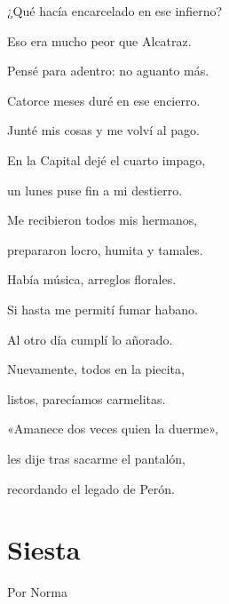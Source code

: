 \documentclass[11pt,twoside,openright,a5paper]{book}
\begin{document}
\begin{center}
¿Qué hacía encarcelado en ese infierno?

Eso era mucho peor que Alcatraz.

Pensé para adentro: no aguanto más.

\vspace{0.5cm}

Catorce meses duré en ese encierro.

Junté mis cosas y me volví al pago.

En la Capital dejé el cuarto impago,

un lunes puse fin a mi destierro.

\vspace{0.5cm}

Me recibieron todos mis hermanos,

prepararon locro, humita y tamales.

Había música, arreglos florales.

Si hasta me permití fumar habano.

\vspace{0.5cm}

Al otro día cumplí lo añorado.

Nuevamente, todos en la piecita,

listos, parecíamos carmelitas.

\vspace{0.5cm}

«Amanece dos veces quien la duerme»,

les dije tras sacarme el pantalón,

recordando el legado de Perón.
\end{center}

\section*{Siesta}
                                                                                                                   \begin{flushright}Por Norma\end{flushright}
\end{document}
